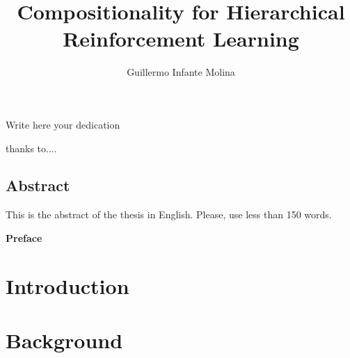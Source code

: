 \documentclass[12pt, a4paper,twoside]{tesi_upf}
\title{Compositionality for Hierarchical Reinforcement Learning}
\subtitle{}
\author{Guillermo Infante Molina}
\begin{document}
\frontmatter

\maketitle

\cleardoublepage



\noindent Write here your dedication

\cleardoublepage



 thanks to....

\cleardoublepage


\section*{\Large \sffamily Abstract}
This is the abstract of the thesis in English.  Please, use less
than 150 words.

\cleardoublepage

{\bf Preface}

\cleardoublepage


\tableofcontents

\listoffigures

\listoftables

\setlength{\parskip}{0.5\baselineskip}
\setlength{\parindent}{0pt}

\mainmatter

\chapter{Introduction}


\chapter{Background}

\end{document}
